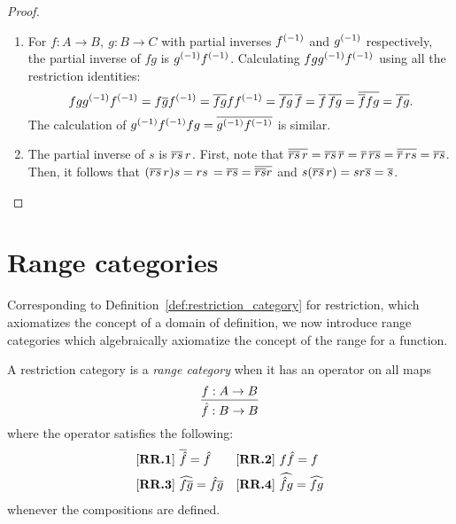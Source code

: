 \begin{proof}
\begin{enumerate}[{(}i{)}]
    \item For $f:A\to B,\ g:B\to C$ with partial inverses ${f}^{(-1)}$ and ${g}^{(-1)}$ respectively,
      the partial inverse of $f g$ is ${g}^{(-1)} {f}^{(-1)}$. Calculating $f g {g}^{(-1)} {f}^{(-1)}$
      using all the restriction identities:
      \[
        f g {g}^{(-1)} {f}^{(-1)} = f \overline{g} {f}^{(-1)} = \overline{f g} f {f}^{(-1)} =
        \overline{f g}\, \overline{f} = \overline{f}\, \overline{f g} = \overline{\overline{f} f g} = \overline{f g}.
      \]
      The calculation of ${g}^{(-1)} {f}^{(-1)} f g = \overline{{g}^{(-1)} {f}^{(-1)}}$ is similar.
    \item The partial inverse of $s$ is $\overline{r s}\,r$. First, note
      that $\overline{\overline{r s}\,r}
      = \overline{r s}\,\overline{r}
      = \overline{r}\, \overline{r s}
      = \overline{\overline{r}\,r s}
      = \overline{r s}$.
      Then, it follows that $(\overline{r s}\,r) s
      = r s\,= \overline{r s}
      = \overline{\overline{r s}r} $ and
      $s (\restr{r s}\,r)
      = s r \restr{s} %
      = \restr{s}$.
  \end{enumerate}
\end{proof}


\section{Range categories} %
\label{sub:range_categories}
Corresponding to Definition~\ref{def:restriction_category} for restriction, which axiomatizes the
concept of a domain of definition, we now introduce range categories
\cite{guox:thesis,cockett-guo-hofstra-2012:range,cockett-guo-hofstra-2012:range2}
which algebraically axiomatize the concept of the range for a function.

\begin{definition}\label{def:range_category}
  A restriction category \X is a \emph{range category} when it has an operator on all maps
  \[
    \infer{\rg{f}:B\to B}{f:A\to B}
  \]
  where the operator satisfies the following:
  \begin{align*}
    &[\text{\bfseries {RR}.{1}}]\ \overline{\hat{f}} = \hat{f} & &
     [\text{\bfseries {RR}.{2}}]\ f \hat{f} = f\\
    &[\text{\bfseries {RR}.{3}}]\ \widehat{f\overline{g}} = \hat{f} \overline{g} & &
     [\text{\bfseries {RR}.{4}}]\  \widehat{\hat{f}g} = \widehat{f g}
  \end{align*}
  whenever the compositions are defined.

\end{definition}

